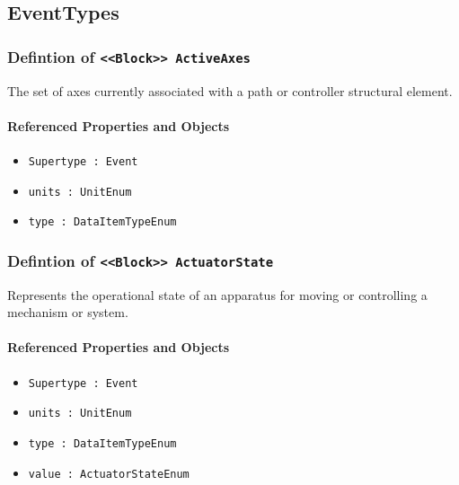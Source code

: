 \subsection{EventTypes} \label{model:EventTypes}
\subsubsection{Defintion of \texttt{<<Block>> ActiveAxes}}
  \label{type:ActiveAxes}

\FloatBarrier

The set of axes currently associated with a path or controller structural element.

\FloatBarrier
\paragraph{Referenced Properties and Objects}

\begin{itemize}
\item \texttt{Supertype : Event}

\item \texttt{units : UnitEnum}

\item \texttt{type : DataItemTypeEnum}

\end{itemize}
\FloatBarrier
\subsubsection{Defintion of \texttt{<<Block>> ActuatorState}}
  \label{type:ActuatorState}

\FloatBarrier

Represents the operational state of an apparatus for moving or controlling a mechanism or system.

\FloatBarrier
\paragraph{Referenced Properties and Objects}

\begin{itemize}
\item \texttt{Supertype : Event}

\item \texttt{units : UnitEnum}

\item \texttt{type : DataItemTypeEnum}

\item \texttt{value : ActuatorStateEnum}

\end{itemize}
\FloatBarrier
